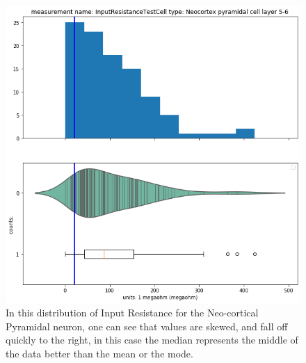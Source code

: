 \begin{figure} 
    \begin{center}   \includegraphics[scale=0.8]{figures/skewed_distribution.png}
    \end{center}
    \caption[Example of skewed NeuroElectro data]{In this distribution of Input Resistance for the Neo-cortical Pyramidal neuron, one can see that values are skewed, and fall off quickly to the right, in this case the median represents the middle of the data better than the mean or the mode.}
\end{figure}   


    
